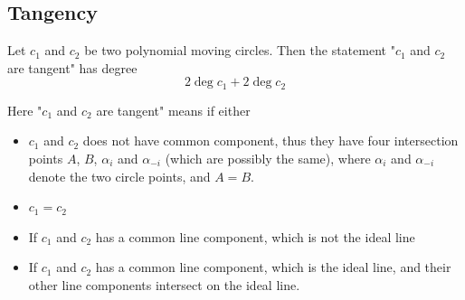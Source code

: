 \documentclass[a4paper]{article}
\begin{document}
\subsection{Tangency}

\begin{theorem}
    Let $c_1$ and $c_2$ be two polynomial moving circles. Then the statement "$c_1$ and $c_2$ are tangent" has degree
    $$2\deg c_1 + 2\deg c_2$$
\end{theorem}
\begin{remark}
    Here "$c_1$ and $c_2$ are tangent" means if either
    \begin{itemize}
        \item $c_1$ and $c_2$ does not have common component, thus they have four intersection points $A$, $B$, $\alpha_i$ and $\alpha_{-i}$ (which are possibly the same), where $\alpha_i$ and $\alpha_{-i}$ denote the two circle points, and $A=B$.
        \item $c_1=c_2$
        \item If $c_1$ and $c_2$ has a common line component, which is not the ideal line
        \item If $c_1$ and $c_2$ has a common line component, which is the ideal line, and their other line components intersect on the ideal line.
    \end{itemize}
\end{remark}
\end{document}
